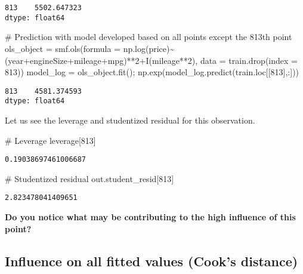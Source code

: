 \documentclass[
  letterpaper,
  DIV=11,
  numbers=noendperiod]{scrreprt}
\newenvironment{Shaded}{\begin{snugshade}}{\end{snugshade}}
\newcommand{\CommentTok}[1]{\textcolor[rgb]{0.37,0.37,0.37}{#1}}
\newcommand{\DecValTok}[1]{\textcolor[rgb]{0.68,0.00,0.00}{#1}}
\newcommand{\NormalTok}[1]{\textcolor[rgb]{0.00,0.23,0.31}{#1}}
\newcommand{\OperatorTok}[1]{\textcolor[rgb]{0.37,0.37,0.37}{#1}}
\newcommand{\StringTok}[1]{\textcolor[rgb]{0.13,0.47,0.30}{#1}}
\begin{document}
\begin{verbatim}
813    5502.647323
dtype: float64
\end{verbatim}

\begin{Shaded}
\begin{Highlighting}[]
\CommentTok{\# Prediction with model developed based on all points except the 813th point}
\NormalTok{ols\_object }\OperatorTok{=}\NormalTok{ smf.ols(formula }\OperatorTok{=} \StringTok{\textquotesingle{}np.log(price)\textasciitilde{}(year+engineSize+mileage+mpg)**2+I(mileage**2)\textquotesingle{}}\NormalTok{, }
\NormalTok{                     data }\OperatorTok{=}\NormalTok{ train.drop(index }\OperatorTok{=} \DecValTok{813}\NormalTok{))}
\NormalTok{model\_log }\OperatorTok{=}\NormalTok{ ols\_object.fit()}\OperatorTok{;}
\NormalTok{np.exp(model\_log.predict(train.loc[[}\DecValTok{813}\NormalTok{],:]))}
\end{Highlighting}
\end{Shaded}

\begin{verbatim}
813    4581.374593
dtype: float64
\end{verbatim}

Let us see the leverage and studentized residual for this observation.

\begin{Shaded}
\begin{Highlighting}[]
\CommentTok{\# Leverage}
\NormalTok{leverage[}\DecValTok{813}\NormalTok{]}
\end{Highlighting}
\end{Shaded}

\begin{verbatim}
0.19038697461006687
\end{verbatim}

\begin{Shaded}
\begin{Highlighting}[]
\CommentTok{\# Studentized residual}
\NormalTok{out.student\_resid[}\DecValTok{813}\NormalTok{]}
\end{Highlighting}
\end{Shaded}

\begin{verbatim}
2.823478041409651
\end{verbatim}

\textbf{Do you notice what may be contributing to the high influence of
this point?}

\subsection{Influence on all fitted values (Cook's
distance)}\label{influence-on-all-fitted-values-cooks-distance}
\end{document}
